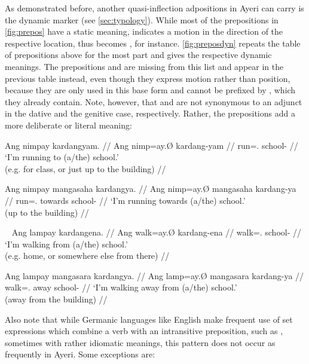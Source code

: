 \label{manga}
As demonstrated before, another quasi-inflection adpositions in Ayeri can carry
is the dynamic marker  (see \autoref{sec:typology}). While most
of the prepositions in \autoref{fig:prepos} have a static meaning,
 indicates a motion in the direction of the respective
location, thus  becomes , for instance. \autoref{fig:preposdyn} repeats the table of
prepositions above for the most part and gives the respective dynamic meanings.
The prepositions  and  are missing
from this list and appear in the previous table instead, even though they
express motion rather than position, because they are only used in this base
form and cannot be prefixed by , which they already contain.
Note, however, that  and  are not
synonymous to an adjunct in the dative and the genitive case, respectively.
Rather, the prepositions add a more deliberate or literal meaning:

\pex
\a\begingl
	\gla Ang nimpay kardangyam. //
	\glb Ang nimp=ay.Ø kardang-yam //
	\glc \AgtT{} run=\Fsg{}.\Top{} school-\Dat{} //
	\glft `I'm running to (a/the) school.' \\
		(e.g. for class, or just up to the building) //
\endgl

\a\begingl
	\gla Ang nimpay mangasaha kardangya. //
	\glb Ang nimp=ay.Ø mangasaha kardang-ya //
	\glc \AgtT{} run=\Fsg{}.\Top{} towards school-\Loc{} //
	\glft `I'm running towards (a/the) school.' \\
		(up to the building) //
\endgl
\xe

\pex~
\a\begingl
	\gla Ang lampay kardangena. //
	\glb Ang walk=ay.Ø kardang-ena //
	\glc \AgtT{} walk=\Fsg{}.\Top{} school-\Gen{} //
	\glft `I'm walking from (a/the) school.' \\
		(e.g. home, or somewhere else from there) //
\endgl

\a\begingl
	\gla Ang lampay mangasara kardangya. //
	\glb Ang lamp=ay.Ø mangasara kardang-ya //
	\glc \AgtT{} walk=\Fsg{}.\Top{} away school-\Loc{} //
	\glft `I'm walking away from (a/the) school.' \\
		(away from the building) //
\endgl
\xe

Also note that while Germanic languages like English make frequent use of set
expressions which combine a verb with an intransitive preposition, such as
, sometimes with rather idiomatic
meanings, this pattern does not occur as frequently in Ayeri. Some exceptions
are:

